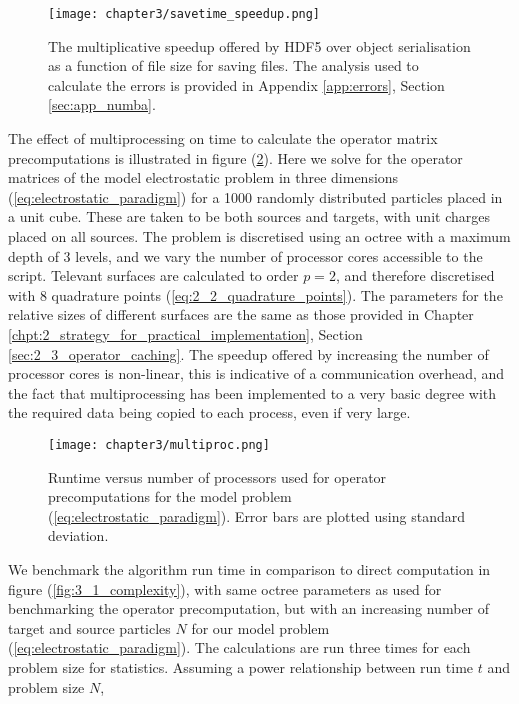 \begin{figure}
    \centering

  {\texttt{[image: chapter3/savetime\_speedup.png]}}
  \vspace{0pt}
    \caption{
        The multiplicative speedup offered by HDF5 over object serialisation
        as a function of file size for saving files.
        The analysis used to calculate the errors is provided in
        Appendix \ref{app:errors}, Section \ref{sec:app_numba}.
    }
    \label{fig:3_1_savetime_speedup}
\end{figure}


The effect of multiprocessing on time to calculate the operator matrix precomputations is
illustrated in figure (\ref{fig:3_1_multiproc}). Here we solve
for the operator matrices of the model electrostatic problem in three dimensions
(\ref{eq:electrostatic_paradigm}) for a 1000 randomly distributed particles placed in
a unit cube. These are taken to be both sources and targets, with unit charges
placed on all sources. The problem is discretised using an octree with a maximum depth of 3 levels,
and we vary the number of processor cores accessible to the script.
Televant surfaces are calculated to order $p=2$, and therefore discretised
with 8 quadrature points (\ref{eq:2_2_quadrature_points}). The parameters for
the relative sizes of different surfaces are the same as those provided
in Chapter \ref{chpt:2_strategy_for_practical_implementation},
Section \ref{sec:2_3_operator_caching}. The speedup offered by increasing the
number of processor cores is non-linear, this is indicative of a communication
overhead, and the fact that multiprocessing has been implemented to a very
basic degree with the required data being copied to each process, even if very large.

\begin{figure}[ht]
    \centering

  {\texttt{[image: chapter3/multiproc.png]}}
  \vspace{0pt}
    \caption{Runtime versus number of processors used for operator precomputations
    for the model problem (\ref{eq:electrostatic_paradigm}). Error bars are
    plotted using standard deviation.
    }
    \label{fig:3_1_multiproc}
\end{figure}

We benchmark the algorithm run time in comparison to direct computation in figure
(\ref{fig:3_1_complexity}), with same octree parameters as used for benchmarking
the operator precomputation, but with an increasing number of target and source
particles $N$ for our model problem (\ref{eq:electrostatic_paradigm}). The
calculations are run three times for each problem size for statistics.
Assuming a power relationship between run time $t$ and problem size $N$,


